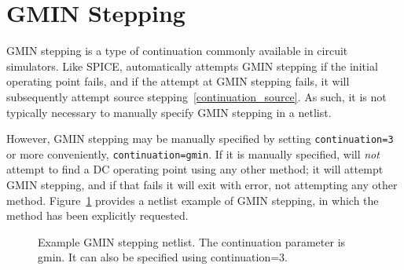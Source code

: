 \newpage 
\section{GMIN Stepping}
\label{continuation_gmin}

GMIN stepping is a type of continuation commonly available in circuit simulators.
Like SPICE, \Xyce{} automatically attempts GMIN stepping if the initial
operating point fails, and if the attempt at GMIN stepping fails, it will subsequently 
attempt source stepping~\ref{continuation_source}.  As such, it is not typically necessary 
to manually specify GMIN stepping in a \Xyce{} netlist.

However, GMIN stepping may be manually specified by setting
\texttt{continuation=3} or more conveniently, \texttt{continuation=gmin}. If it 
is manually specified, \Xyce{} will \emph{not} attempt to find a DC operating 
point using any other method; it will attempt GMIN stepping, and if that fails 
it will exit with error, not attempting any other method.  Figure~\ref{Gmin_netlist} 
provides a netlist example of GMIN stepping, in which the method has been
explicitly requested.

\begin{figure}[htbp]
\begin{centering}
\caption [Example GMIN stepping netlist.]{Example GMIN stepping netlist. The continuation parameter is gmin. 
It can also be specified using continuation=3. \label  {Gmin_netlist}}
\end{centering}
\end{figure}

